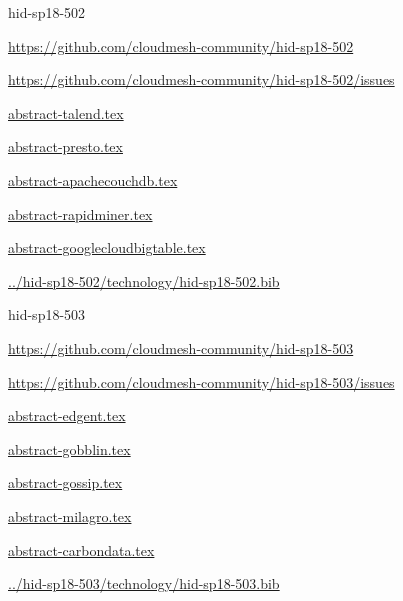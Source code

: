\begin{IU}

hid-sp18-502

\url{https://github.com/cloudmesh-community/hid-sp18-502}

\url{https://github.com/cloudmesh-community/hid-sp18-502/issues}

\href{https://github.com/cloudmesh-community/hid-sp18-502/blob/master//technology/abstract-talend.tex}{abstract-talend.tex}

\href{https://github.com/cloudmesh-community/hid-sp18-502/blob/master//technology/abstract-presto.tex}{abstract-presto.tex}

\href{https://github.com/cloudmesh-community/hid-sp18-502/blob/master//technology/abstract-apachecouchdb.tex}{abstract-apachecouchdb.tex}

\href{https://github.com/cloudmesh-community/hid-sp18-502/blob/master//technology/abstract-rapidminer.tex}{abstract-rapidminer.tex}

\href{https://github.com/cloudmesh-community/hid-sp18-502/blob/master//technology/abstract-googlecloudbigtable.tex}{abstract-googlecloudbigtable.tex}

\href{https://github.com/cloudmesh-community/hid-sp18-502/blob/master//technology/hid-sp18-502.bib}{../hid-sp18-502/technology/hid-sp18-502.bib}

\end{IU}


\begin{IU}

hid-sp18-503

\url{https://github.com/cloudmesh-community/hid-sp18-503}

\url{https://github.com/cloudmesh-community/hid-sp18-503/issues}

\href{https://github.com/cloudmesh-community/hid-sp18-503/blob/master//technology/abstract-edgent.tex}{abstract-edgent.tex}

\href{https://github.com/cloudmesh-community/hid-sp18-503/blob/master//technology/abstract-gobblin.tex}{abstract-gobblin.tex}

\href{https://github.com/cloudmesh-community/hid-sp18-503/blob/master//technology/abstract-gossip.tex}{abstract-gossip.tex}

\href{https://github.com/cloudmesh-community/hid-sp18-503/blob/master//technology/abstract-milagro.tex}{abstract-milagro.tex}

\href{https://github.com/cloudmesh-community/hid-sp18-503/blob/master//technology/abstract-carbondata.tex}{abstract-carbondata.tex}

\href{https://github.com/cloudmesh-community/hid-sp18-503/blob/master//technology/hid-sp18-503.bib}{../hid-sp18-503/technology/hid-sp18-503.bib}

\end{IU}


